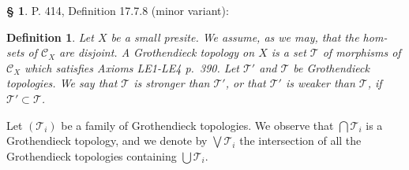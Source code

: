 \documentclass[12pt]{article}%
\newtheorem{df}[thm]{Definition}%
\theoremstyle{remark}
\theoremstyle{definition}
\newtheorem{s}[thm]{\S}%
\newcommand{\cc}{\mathcal}
\newcommand{\oo}{\operatorname}
\newcommand{\C}{\mathcal C}
\begin{document}
%

\begin{comment}

\begin{s}%
P. 413, Lemma 17.2.5 (ii). It seems to me one can prove: 

If $f:X\to Y$ is a weakly exact morphism of presites, then $(f^t)\ \widehat{}:\C_Y^\wedge\to\C_X^\wedge$ is left exact. 

Proof: We have a quasi-commutative diagram 
$$
\begin{tikzcd}
\C_Y^\wedge\ar{r}{F}\ar[bend right]{rrr}[swap]{(f^t)\,\,\widehat{}}&((\C_X)_{(f^t)\,\,\widehat{}\,\,(\oo{pt}_Y)})^\wedge\ar{r}{G}&(\C_X^\wedge)_{(f^t)\,\,\widehat{}\,\,(\oo{pt}_Y)}\ar{r}{H}&\C_X^\wedge,
\end{tikzcd}
$$ 
where $G$ is the equivalence of Lemma 1.4.12 p.~26 of the book. The functor $F$ is left exact by Corollary 3.3.19 p.~87 of the book, and the functor $H$ is left exact by Lemma 2.1.13 (ii) p.~41 and Proposition 3.3.3 p. 82 of the book.
\end{s}

\end{comment}

%

\begin{s} 
P. 414, Definition 17.7.8 (minor variant):
%
\begin{df}\label{1778}
Let $X$ be a small presite. We assume, as we may, that the hom-sets of $\C_X$ are disjoint. A {\em Grothendieck topology} on $X$ is a set $\cc T$ of morphisms of $\C_X$ which satisfies Axioms LE1-LE4 p.~390. Let $\cc T'$ and $\cc T$ be Grothendieck topologies. We say that $\cc T$ is {\em stronger than} $\cc T'$, or that $\cc T'$ is {\em weaker than} $\cc T$, if $\cc T'\subset\cc T$. 
\end{df}
%
Let $(\cc T_i)$ be a family of Grothendieck topologies. We observe that $\bigcap\cc T_i$ is a Grothendieck topology, and we denote by $\bigvee\cc T_i$ the intersection of all the Grothendieck topologies containing $\bigcup\cc T_i$.
\end{s}

%
\end{document}

